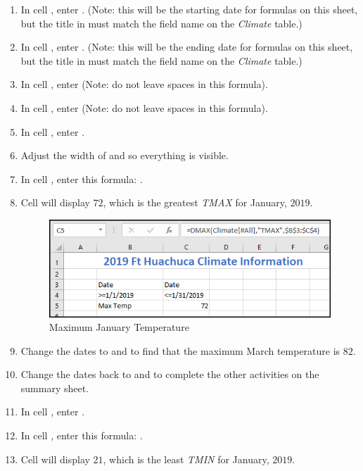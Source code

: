\begin{enumbox}
\begin{enumerate}
		\item In cell , enter . (Note: this will be the starting date for formulas on this sheet, but the title in  must match the field name on the \textit{Climate} table.)
		\item In cell , enter . (Note: this will be the ending date for formulas on this sheet, but the title in  must match the field name on the \textit{Climate} table.)
		\item In cell , enter  (Note: do not leave spaces in this formula).
		\item In cell , enter  (Note: do not leave spaces in this formula).
		\item In cell , enter .
		\item Adjust the width of  and  so everything is visible.
		\item In cell , enter this formula: .
		\item Cell  will display $ 72 $, which is the greatest \textit{TMAX} for January, $ 2019 $.
	
		\begin{figure}[H]
			\centering
			\includegraphics[width=\maxwidth{.95\linewidth}]{gfx/ch09_fig86}
			\caption{Maximum January Temperature}
			\label{09:fig86}
		\end{figure}
	
		\item Change the dates to  and  to find that the maximum March temperature is $ 82 $.
		\item Change the dates back to  and  to complete the other activities on the summary sheet.
	
		\item In cell , enter .
		\item In cell , enter this formula: .
		\item Cell  will display $ 21 $, which is the least \textit{TMIN} for January, $ 2019 $.
	

\end{enumerate}
\end{enumbox}
